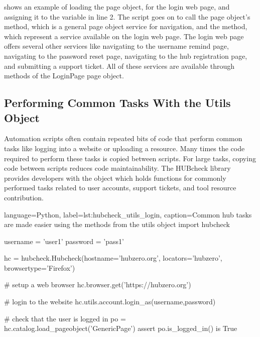  shows an example of loading the
 page object, for the login web page, and assigning it to the
variable  in line 2. The script goes on to call the page object's
 method, which is a general page object service for
navigation, and the  method, which represent a service
available on the login web page. The login web page offers several other
services like navigating to the username remind page, navigating to the
password reset page, navigating to the hub registration page, and submitting a
support ticket. All of these services are available through methods of the
LoginPage page object.



\subsection{Performing Common Tasks With the Utils Object}
\label{ssec:hubcheck_web_modules_common_tasks}

Automation scripts often contain repeated bits of code that perform common
tasks like logging into a website or uploading a resource. Many times the code
required to perform these tasks is copied between scripts. For large tasks,
copying code between scripts reduces code maintainability.  The HUBcheck
library provides developers with the  object which holds
functions for commonly performed tasks related to user accounts, support
tickets, and tool resource contribution.


\begin{xcode}{%
  language=Python,%
  label=lst:hubcheck_utils_login,%
  caption={Common hub tasks are made easier using the methods from the utils object}%
}
import hubcheck

username = 'user1'
password = 'pass1'

hc = hubcheck.Hubcheck(hostname='hubzero.org',
                       locators='hubzero',
                       browsertype='Firefox')

# setup a web browser
hc.browser.get('https://hubzero.org')

# login to the website
hc.utils.account.login_as(username,password)

# check that the user is logged in
po = hc.catalog.load_pageobject('GenericPage')
assert po.is_logged_in() is True
\end{xcode}

